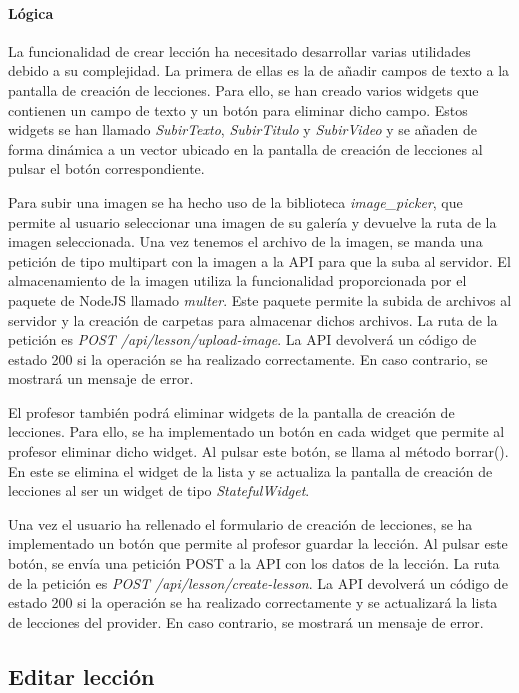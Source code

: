 \paragraph*{Lógica}
La funcionalidad de crear lección ha necesitado desarrollar varias utilidades debido a su complejidad. 
La primera de ellas es la de añadir campos de texto a la pantalla de creación de lecciones. Para ello, se han creado varios widgets que contienen un campo de texto y un botón para eliminar dicho campo. Estos widgets se han llamado \textit{SubirTexto}, \textit{SubirTitulo} y \textit{SubirVideo} y se añaden de forma dinámica a un vector ubicado en la pantalla de creación de lecciones al pulsar el botón correspondiente.

Para subir una imagen se ha hecho uso de la biblioteca \textit{image\_picker}, que permite al usuario seleccionar una imagen de su galería y
devuelve la ruta de la imagen seleccionada. Una vez tenemos el archivo de la imagen, se manda una petición de tipo multipart con la imagen a la API para que la suba al servidor.
El almacenamiento de la imagen utiliza la funcionalidad proporcionada por el paquete de NodeJS llamado \textit{multer}. Este paquete permite la subida de archivos al servidor y la creación de carpetas para almacenar dichos archivos.
La ruta de la petición es \textit{POST /api/lesson/upload-image}. La API devolverá un código de estado 200 si la operación se ha realizado correctamente. En caso contrario, se mostrará un mensaje de error.

El profesor también podrá eliminar widgets de la pantalla de creación de lecciones. Para ello, se ha implementado un botón en cada widget que permite al profesor eliminar dicho widget. Al pulsar este botón, se llama al método borrar(). En este se elimina el widget de la lista y se actualiza la pantalla de creación de lecciones al ser un widget de tipo \textit{StatefulWidget}.

Una vez el usuario ha rellenado el formulario de creación de lecciones, se ha implementado un botón que permite al profesor guardar la lección. Al pulsar este botón, se envía una petición POST a la API con los datos de la lección. La ruta de la petición es \textit{POST /api/lesson/create-lesson}. La API devolverá un código de estado 200 si la operación se ha realizado correctamente y se actualizará la lista de lecciones del provider. En caso contrario, se mostrará un mensaje de error.


\subsection{Editar lección} 

